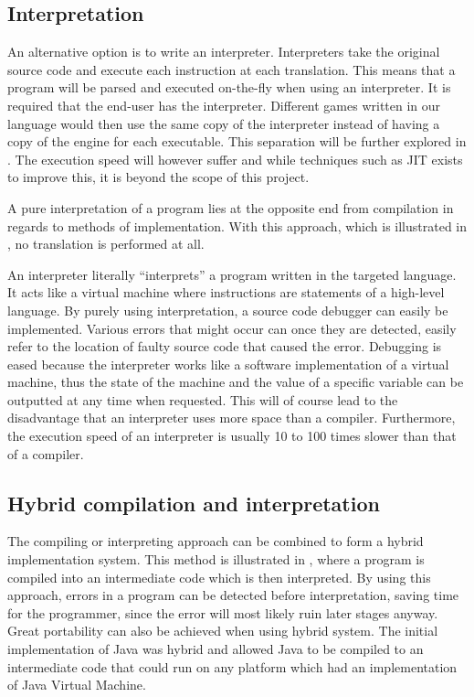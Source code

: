 \subsection{Interpretation}
\label{sec:interpretation}
An alternative option is to write an interpreter. Interpreters take the
original source code and execute each instruction at each translation.
This means that a program will be parsed and executed on-the-fly
when using an interpreter. It is required that the end-user has the
interpreter. Different games written in our language would then use
the same copy of the interpreter instead of having a copy of the
engine for each executable. This separation will be further explored
in . The execution speed will however
suffer and while techniques such as JIT exists to improve this, it is
beyond the scope of this project.

A pure interpretation of a program lies at the opposite end from compilation in
regards to methods of implementation. With this approach, which is illustrated in
, no translation is performed at all.



An interpreter literally ``interprets'' a program written in the targeted language. It
acts like a virtual machine where instructions are statements of a high-level
language. By purely using interpretation, a source code debugger can easily be
implemented. Various errors that might occur can once they are detected, easily
refer to the location of faulty source code that caused the error. Debugging is
eased because the interpreter works like a software implementation of a virtual
machine, thus the state of the machine and the value of a specific variable can
be outputted at any time when requested. This will of course lead to the
disadvantage that an interpreter uses more space than a compiler. Furthermore,
the execution speed of an interpreter is usually 10 to 100 times slower than
that of a compiler.
\cite[p. 48]{sebesta2013}

\subsection{Hybrid compilation and interpretation}
The compiling or interpreting approach can be combined to form
a hybrid implementation system. This method is illustrated in
, where a program is compiled into
an intermediate code which is then interpreted. By using this approach,
errors in a program can be detected before interpretation, saving time
for the programmer, since the error will most likely ruin later stages
anyway. Great portability can also be achieved when using hybrid system.
The initial implementation of Java was hybrid and allowed Java to be
compiled to an intermediate code that could run on any platform which
had an implementation of Java Virtual Machine. \cite[p. 50]{sebesta2013}


